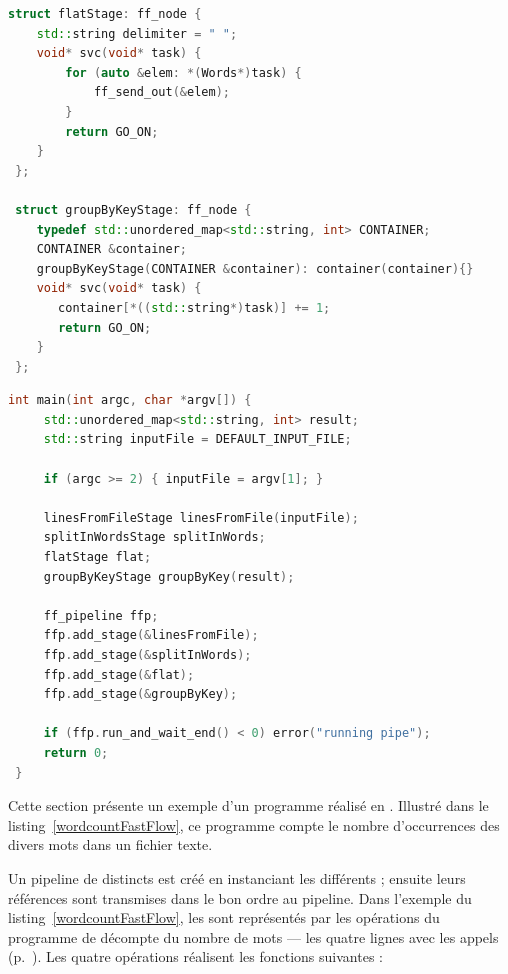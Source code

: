 \begin{lstlisting}[language=c++, frame=single,float]
 struct flatStage: ff_node {
    std::string delimiter = " ";
    void* svc(void* task) {
        for (auto &elem: *(Words*)task) {
            ff_send_out(&elem);
        }
        return GO_ON;
    }
 };
 
 struct groupByKeyStage: ff_node {
    typedef std::unordered_map<std::string, int> CONTAINER;
    CONTAINER &container;
    groupByKeyStage(CONTAINER &container): container(container){}
    void* svc(void* task) {
       container[*((std::string*)task)] += 1;
       return GO_ON;
    }
 };
\end{lstlisting}
 
\begin{lstlisting}[language=c++, frame=single, float,label={addStage.listing}]
 int main(int argc, char *argv[]) {
     std::unordered_map<std::string, int> result;
     std::string inputFile = DEFAULT_INPUT_FILE;

     if (argc >= 2) { inputFile = argv[1]; } 

     linesFromFileStage linesFromFile(inputFile);
     splitInWordsStage splitInWords;
     flatStage flat;
     groupByKeyStage groupByKey(result);

     ff_pipeline ffp;
     ffp.add_stage(&linesFromFile);
     ffp.add_stage(&splitInWords);
     ffp.add_stage(&flat);
     ffp.add_stage(&groupByKey);

     if (ffp.run_and_wait_end() < 0) error("running pipe");
     return 0;
 }
\end{lstlisting}

Cette section pr\'esente un exemple d'un programme r\'ealis\'e en . Illustr\'e dans le listing~\ref{wordcountFastFlow}, ce programme compte le nombre d'occurrences des divers mots dans un fichier texte. 

Un {pipeline} de   distincts est cr\'e\'e en instanciant les  diff\'erents ; ensuite leurs r\'ef\'erences sont transmises dans le bon ordre au {pipeline}. Dans l'exemple du listing~\ref{wordcountFastFlow}, les  sont repr\'esent\'es par les op\'erations du programme de d\'ecompte du nombre de mots --- les quatre lignes avec les appels  (p.~\pageref{addStage.listing}).  Les quatre op\'erations r\'ealisent les fonctions suivantes :

